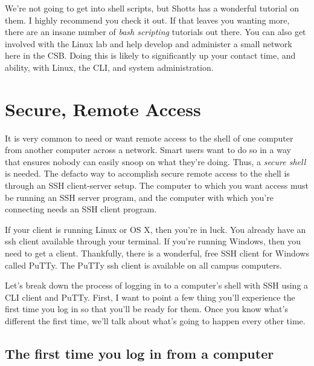 \documentclass[]{tufte-handout}
\begin{document}
We're not going to get into shell scripts, but Shotts has a wonderful tutorial on them. I highly recommend you check it out.  If that leaves you wanting more, there are an insane number of \textit{bash scripting} tutorials out there.  You can also get involved with the Linux lab and help develop and administer a small network here in the CSB.  Doing this is likely to significantly up your contact time, and ability, with Linux, the CLI, and system administration.

\section{Secure, Remote Access} 

It is very common to need or want remote access to the shell of one computer from another computer across a network. Smart users want to do so in a way that ensures nobody can easily snoop on what they're doing. Thus, a \textit{secure shell} is needed. The defacto way to accomplish secure remote access to the shell is through an SSH client-server setup.  The computer to which you want access must be running an SSH server program, and the computer with which you're connecting needs an SSH client program.  

If your client is running Linux or OS X, then you're in luck. You already have an ssh client available through your terminal.  If you're running Windows, then you need to get a client. Thankfully, there is a wonderful, free SSH client for Windows called PuTTy.  The PuTTy ssh client is available on all campus computers. 

Let's break down the process of logging in to a computer's shell with SSH using a CLI client and PuTTy.  First, I want to point a few thing you'll experience the first time you log in so that you'll be ready for them. Once you know what's different the first time, we'll talk about what's going to happen every other time.

\subsection{The first time you log in from a computer}
\end{document}
